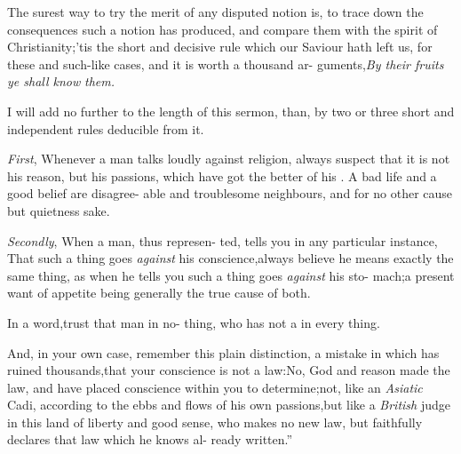 \documentclass{article}
\begin{document}
\lqq The surest way to try the merit of\break
\lqq any disputed notion is, to trace down\break
\lqq the consequences such a notion has\break
\lqq produced, and compare them with the\break
\lqq spirit of Christianity;\tsh ’tis the short\break
\lqq and decisive rule which our Saviour\break
\lqq hath left us, for these and such-like\break
\lqq cases, and it is worth a thousand ar-\break
\lqq guments,\tsk \textit{By their fruits ye shall know}\break
\lqq \textit{them.} 

\lqq I will add no further to the length\break
\lqq of this sermon, than, by two or three
\lqq short and independent rules deducible\break
\lqq from it.

\lqq \textit{First}, Whenever a man talks loudly\break
\lqq against religion, always suspect that it\break
\lqq is not his reason, but his passions, which\break
\lqq have got the better of his . A\break
\lqq bad life and a good belief are disagree-\break
\lqq able and troublesome neighbours, and\break
\lqq {}\break
\lqq for no other cause but quietness sake.

\lqq \textit{Secondly}, When a man, thus represen-\break
\lqq ted, tells you in any particular instance,\break
\lqq \tsk That such a thing goes \textit{against} his\break
\lqq conscience,\tsk always believe he means\break
\lqq exactly the same thing, as when he tells\break
\lqq you such a thing goes \textit{against} his sto-\break
\lqq mach;\tsk a present want of appetite\break
\lqq being generally the true cause of both.\\\newpage

\lqq In a word,\tsk trust that man in no-\break
\lqq thing, who has not a  in\break
\lqq every thing.

\lqq And, in your own case, remember\break
\lqq this plain distinction, a mistake in\break
\lqq which has ruined thousands,\tsk that\break
\lqq your conscience is not a law:\tsk No,\break
\lqq God and reason made the law, and\break
\lqq have placed conscience within you to\break
\lqq determine;\tsh not, like an \textit{Asiatic} Cadi,\break
\lqq according to the ebbs and flows of his\break
\lqq own passions,\tsk but like a \textit{British} judge\break
\lqq in this land of liberty and good sense,\break
\lqq who makes no new law, but faithfully\break
\lqq declares that law which he knows al-\break
\lqq ready written.”

\bigskip
\end{document}

